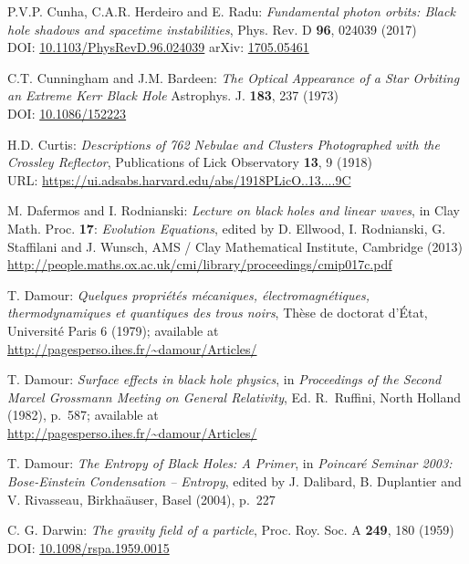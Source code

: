 \begin{thebibliography}{123}
P.V.P. Cunha, C.A.R. Herdeiro and E. Radu:
{\em Fundamental photon orbits: Black hole shadows and spacetime instabilities},
Phys. Rev. D {\bf 96}, 024039 (2017)\\
DOI: \href{https://doi.org/10.1103/PhysRevD.96.024039}{10.1103/PhysRevD.96.024039}\hfill
arXiv: \href{https://arxiv.org/abs/1705.05461}{1705.05461}

C.T. Cunningham and J.M. Bardeen:
{\em The Optical Appearance of a Star Orbiting an Extreme Kerr Black Hole}
Astrophys. J. {\bf 183}, 237 (1973)\\
DOI: \href{https://doi.org/10.1086/152223}{10.1086/152223}

H.D. Curtis:
{\em Descriptions of 762 Nebulae and Clusters Photographed with the Crossley Reflector},
Publications of Lick Observatory {\bf 13}, 9 (1918)\\
URL: \url{https://ui.adsabs.harvard.edu/abs/1918PLicO..13....9C}

M. Dafermos and I. Rodnianski: {\em Lecture on black holes and linear waves},
in  Clay Math. Proc. {\bf 17}: {\em Evolution Equations}, edited by
D. Ellwood, I. Rodnianski, G. Staffilani and J. Wunsch, AMS / Clay Mathematical Institute,
Cambridge (2013) \\
\url{http://people.maths.ox.ac.uk/cmi/library/proceedings/cmip017c.pdf}

T. Damour: {\em Quelques propri\'et\'es m\'ecaniques, \'electromagn\'etiques,
thermo\-dy\-na\-mi\-ques et quantiques des trous noirs},
Th\`ese de doctorat d'\'Etat, Universit\'e Paris 6 (1979); available at\\
\url{http://pagesperso.ihes.fr/~damour/Articles/}

T. Damour: {\em Surface effects in black hole physics},
in {\em Proceedings of the Second Marcel Grossmann Meeting on General
Relativity}, Ed. R.~Ruffini, North Holland (1982), p.~587; available at\\
\url{http://pagesperso.ihes.fr/~damour/Articles/}

T. Damour: {\em The Entropy of Black Holes: A Primer},
in {\em Poincaré Seminar 2003: Bose-Einstein Condensation -- Entropy},
edited by J. Dalibard, B. Duplantier and V. Rivasseau, Birkha\"auser, Basel (2004),
p.~227

C. G. Darwin: {\em The gravity field of a particle},
Proc. Roy. Soc. A {\bf 249}, 180 (1959)\\
DOI: \href{https://doi.org/10.1098/rspa.1959.0015}{10.1098/rspa.1959.0015}


\end{thebibliography}
